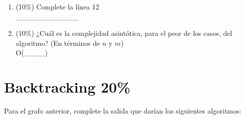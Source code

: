 \documentclass[twocolumn]{article}
\begin{document}
\begin{enumerate}[label=\Alph*]


    \item (10\%) Complete la línea 12\\


  \_\_\_\_\_\_\_\_\_\_\_\_

      \item (10\%) ¿Cuál es la complejidad asintótica, para el peor de los casos, del algoritmo? (En términos de $n$ y $m$)\\


  O(\_\_\_\_)


\end{enumerate}



\section{Backtracking 20\%}

Para el grafo anterior, complete la salida
que darían los siguientes algoritmos:
\end{document}
